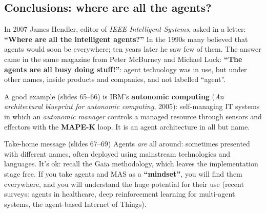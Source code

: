 \subsection{Conclusions: where are all the agents?}
\label{sec:conclusions-emas}

In 2007 James Hendler, editor of \emph{IEEE Intelligent Systems}, asked in a letter:
\textbf{``Where are all the intelligent agents?''} In the 1990s many believed that agents
would soon be everywhere; ten years later he saw few of them. The answer came in the same
magazine from Peter McBurney and Michael Luck: \textbf{``The agents are all busy doing
stuff!''}: agent technology was in use, but under other names, inside products and
companies, and not labelled ``agent''.

A good example (slides 65--66) is IBM's \textbf{autonomic computing} (\emph{An
architectural blueprint for autonomic computing}, 2005): self-managing IT systems in which
an \emph{autonomic manager} controls a managed resource through sensors and effectors with
the \textbf{MAPE-K} loop. It is an agent architecture in all but name.

\begin{center}
\end{center}

\begin{nbfact}{Take-home message (slides 67--69)}
Agents \emph{are} all around: sometimes presented with different names, often deployed
using mainstream technologies and languages. It's ok: recall the Gaia methodology, which
leaves the implementation stage free. If you take agents and MAS as a
\textbf{``mindset''}, you will find them everywhere, and you will understand the huge
potential for their use (recent surveys: agents in healthcare, deep reinforcement learning
for multi-agent systems, the agent-based Internet of Things).
\end{nbfact}

